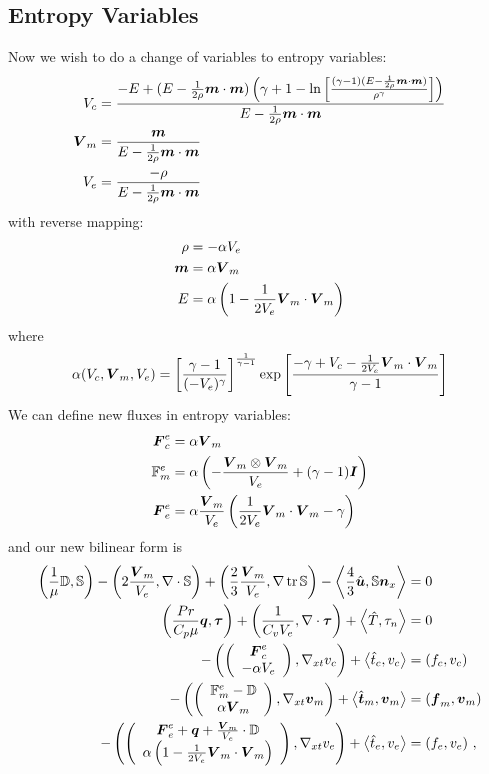 \documentclass{article}
\begin{document}
\subsection*{Entropy Variables}
Now we wish to do a change of variables to entropy variables:
\begin{align*}
V_c&=\frac{-E+(E-\frac{1}{2\rho}\boldsymbol m\cdot\boldsymbol m)\left( \gamma+1-\ln\left[ \frac{(\gamma-1)(E-\frac{1}{2\rho}\boldsymbol m\cdot\boldsymbol m)}{\rho^\gamma} \right] \right)}
{E-\frac{1}{2\rho}\boldsymbol m\cdot\boldsymbol m}\\
\boldsymbol V_m&=\frac{\boldsymbol m}{E-\frac{1}{2\rho}\boldsymbol m\cdot\boldsymbol m}\\
V_e&=\frac{-\rho}{E-\frac{1}{2\rho}\boldsymbol m\cdot\boldsymbol m}\\
\end{align*}
with reverse mapping:
\begin{align*}
\rho&=-\alpha V_e\\
\boldsymbol m&=\alpha\boldsymbol V_m\\
E&=\alpha\left( 1-\frac{1}{2V_e}\boldsymbol V_m\cdot\boldsymbol V_m \right)\\
\end{align*}
where 
\[
\alpha(V_c,\boldsymbol V_m,V_e)=\left[ \frac{\gamma-1}{(-V_e)^\gamma} \right]^{\frac{1}{\gamma-1}}\exp\left[ \frac{-\gamma+V_c-\frac{1}{2V_e}\boldsymbol V_m\cdot\boldsymbol V_m}{\gamma-1} \right]
\]
We can define new fluxes in entropy variables:
\begin{align*}
\boldsymbol F^e_c&=\alpha\boldsymbol V_m\\
\mathbb{F}^e_m&=\alpha\left( -\frac{\boldsymbol V_m\otimes\boldsymbol V_m}{V_e}+(\gamma-1)\boldsymbol I \right)\\
\boldsymbol F^e_e&=\alpha\frac{\boldsymbol V_m}{V_e}\left( \frac{1}{2V_e}\boldsymbol V_m\cdot\boldsymbol V_m-\gamma \right)\\
\end{align*}
and our new bilinear form is
\begin{subequations}
\label{eq:entropyBF}
\begin{align}
	\left( \frac{1}{\mu}\mathbb{D},\mathbb{S} \right)-\left( 2\frac{\boldsymbol V_m}{V_e},\nabla\cdot\mathbb{S} \right)+\left( \frac{2}{3}\frac{\boldsymbol V_m}{V_e},\nabla\operatorname*{tr}{\mathbb{S}} \right)
	-\left\langle \frac{4}{3}\hat{\boldsymbol u},\mathbb{S}\boldsymbol n_x \right\rangle&=0\\
	\left( \frac{Pr}{C_p\mu}\boldsymbol q,\boldsymbol\tau \right)+\left( \frac{1}{C_vV_e},\nabla\cdot\boldsymbol\tau \right)+\left\langle \hat T,\tau_n \right\rangle&=0\\
	-\left( \left( \begin{array}{c} \boldsymbol F^e_c\\ -\alpha V_e\\ \end{array} \right),\nabla_{xt} v_c \right)+\left\langle \hat t_c,v_c \right\rangle&=\left( f_c,v_c \right)\\
	-\left( \left( \begin{array}{c} \mathbb{F}^e_m-\mathbb{D}\\ \alpha\boldsymbol V_m\\ \end{array} \right),\nabla_{xt}\boldsymbol v_m \right)+\left\langle \hat{\boldsymbol t}_m,\boldsymbol v_m \right\rangle&=\left( \boldsymbol f_m,\boldsymbol v_m \right)\\
	-\left( \left( \begin{array}{c} \boldsymbol F^e_e+\boldsymbol q+\frac{\boldsymbol V_m}{V_e}\cdot\mathbb{D}\\ \alpha\left( 1-\frac{1}{2V_e}\boldsymbol V_m\cdot\boldsymbol V_m \right)\\ \end{array} \right),\nabla_{xt} v_e \right)
	+\left\langle \hat t_e,v_e \right\rangle&=\left( f_e,v_e \right)\,,
\end{align}
\end{subequations}
\end{document}
